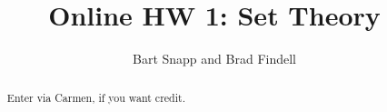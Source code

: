 \documentclass[handout,space,nooutcomes]{xourse}
\title{Online HW 1: Set Theory}
\author{Bart Snapp and Brad Findell}
\begin{document}
\begin{abstract}
Enter via Carmen, if you want credit.  
\end{abstract}
\maketitle

{}
\end{document}
